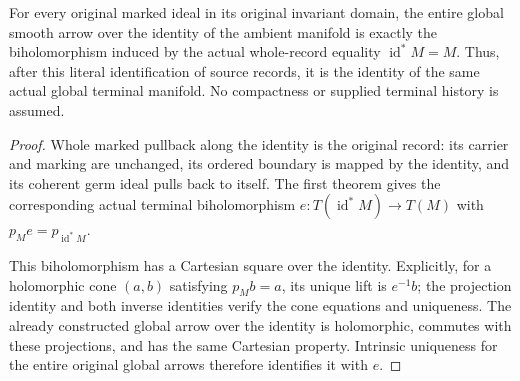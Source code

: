 \begin{theorem}
\label{hir:original-arbitrary-target-global-smooth-arrow-identity}
\leanok
For every original marked ideal in its original invariant domain, the entire
global smooth arrow over the identity of the ambient manifold is exactly the
biholomorphism induced by the actual whole-record equality
$\operatorname{id}^*M=M$.  Thus, after this literal identification of source
records, it is the identity of the same actual global terminal manifold. No
compactness or supplied terminal history is assumed.
\end{theorem}
\begin{proof}
Whole marked pullback along the identity is the original record: its carrier
and marking are unchanged, its ordered boundary is mapped by the identity,
and its coherent germ ideal pulls back to itself. The first theorem gives the
corresponding actual terminal biholomorphism $e:T(\operatorname{id}^*M)\to
T(M)$ with $p_M e=p_{\operatorname{id}^*M}$.

This biholomorphism has a Cartesian square over the identity. Explicitly, for
a holomorphic cone $(a,b)$ satisfying $p_M b=a$, its unique lift is $e^{-1}b$;
the projection identity and both inverse identities verify the cone equations
and uniqueness. The already constructed global arrow over the identity is
holomorphic, commutes with these projections, and has the same Cartesian
property. Intrinsic uniqueness for the entire original global arrows
therefore identifies it with $e$.
\end{proof}

